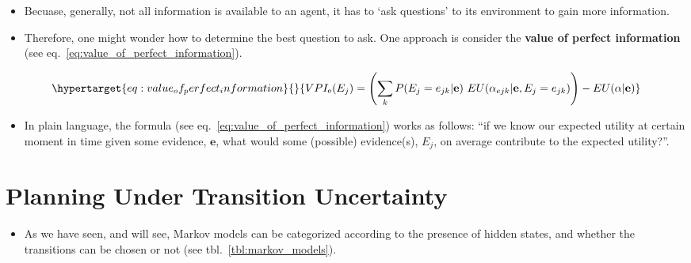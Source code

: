 \documentclass[
]{book}
\providecommand{\tightlist}{%
  \setlength{\itemsep}{0pt}\setlength{\parskip}{0pt}}
\begin{document}
\begin{itemize}
\tightlist
\item
  Becuase, generally, not all information is available to an agent, it
  has to `ask questions' to its environment to gain more information.
\item
  Therefore, one might wonder how to determine the best question to ask.
  One approach is consider the \textbf{value of perfect information}
  (see eq.~\ref{eq:value_of_perfect_information}).
\end{itemize}

\begin{equation}\protect\hypertarget{eq:value_of_perfect_information}{}{
V P I_{\mathrm{e}}(E_{j})=\left(\sum_{k}P(E_{j}=e_{j k}|\mathbf{e})\ E U(\alpha_{e j k}|\mathbf{e},E_{j}=e_{j k})\right)-E U(\alpha|\mathbf{e})
}\label{eq:value_of_perfect_information}\end{equation}

\begin{itemize}
\tightlist
\item
  In plain language, the formula (see
  eq.~\ref{eq:value_of_perfect_information}) works as follows: ``if we
  know our expected utility at certain moment in time given some
  evidence, \(\mathbf{e}\), what would some (possible) evidence(s),
  \(E_j\), on average contribute to the expected utility?''.
\end{itemize}

\hypertarget{planning-under-transition-uncertainty}{%
\chapter{Planning Under Transition
Uncertainty}\label{planning-under-transition-uncertainty}}

\begin{itemize}
\tightlist
\item
  As we have seen, and will see, Markov models can be categorized
  according to the presence of hidden states, and whether the
  transitions can be chosen or not (see tbl.~\ref{tbl:markov_models}).
\end{itemize}
\end{document}
